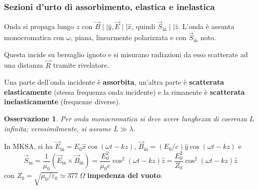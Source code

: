 \documentclass[10pt, a4paper]{scrartcl}
\numberwithin{equation}{subsection}
\theoremstyle{style1}
\newtheorem{osservazione}{Osservazione}[section]
\begin{document}
\subsubsection{Sezioni d'urto di assorbimento, elastica e inelastica}

Onda si propaga lungo $z$ con $\vec{B} \mid  \mid \hat{y}, \vec{E} \mid  \mid \hat{x}$, quindi $\vec{S}_\text{in} \mid  \mid \hat{z}$. L'onda \`e assunta monocromatica con $\omega$, piana, linearmente polarizzata e con $\vec{S}_\text{in}$ noto.

Questa incide su bersaglio ignoto e si misurano radiazioni da esso scatterate ad una distanza $\vec{R}$ tramite rivelatore. 

Una parte dell'onda incidente \`e \textbf{assorbita}, un'altra parte \`e \textbf{scatterata elasticamente} (stessa frequenza onda incidente) e la rimanente \`e \textbf{scatterata inelasticamente} (frequenze diverse).

\begin{osservazione}
	Per onda monocromatica si deve avere lunghezza di coerenza $L$ infinita; verosimilmente, si assume $L \gg \lambda$.
\end{osservazione}
\noindent In MKSA, si ha $\vec{E}_\text{in}= E_0\hat{x}\cos(\omega t -kz)$, $\vec{B}_\text{in}= (E_0 / c) \hat{y}\cos(\omega t- kz)$ e 
\begin{equation}
\vec{S}_\text{in}=\frac{1}{\mu_0} (\vec{E}_\text{in}\times \vec{B}_\text{in}) = \frac{E_0^2}{\mu_0 c} \cos^2(\omega t - kz) \hat{z}= \frac{E_0^2}{Z_0} \cos^2 (\omega t- kz) \hat{z}
\end{equation}
con $Z_0 = \sqrt{\mu_0 / \varepsilon _0} \simeq 377 \ \Omega $ \textbf{impedenza del vuoto}.
\end{document}

